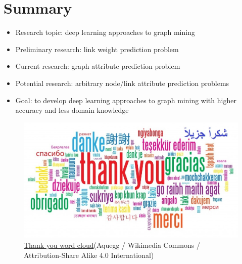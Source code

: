 \documentclass{article}
\begin{document}
\section{Summary}
\begin{itemize}
	\item Research topic: deep learning approaches to graph mining
	\item Preliminary research: link weight prediction problem
	\item Current research: graph attribute prediction problem
	\item Potential research: arbitrary node/link attribute prediction problems
	\item Goal: to develop deep learning approaches to graph mining with higher accuracy and less domain knowledge
\end{itemize}

\begin{figure}[H]
	\centering
	\includegraphics[width=\linewidth]{Thank-you-word-cloud}
	\caption{ \href{https://commons.wikimedia.org/wiki/File:Spectrogram-19thC.png}{Thank you word cloud}(Aquegg / Wikimedia Commons / Attribution-Share Alike 4.0 International)}
	\label{fig:Thank-you-word-cloud}
\end{figure}
\end{document}
